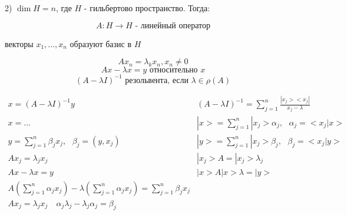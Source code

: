 \documentclass[12pt, a4paper]{report}
\begin{document}
2) \( \dim H = n \), где \( H \) - гильбертово пространство. Тогда: 

\[ A : H \to  H \text{ - линейный оператор}  \] 

векторы \( x_1, \ldots, x_n \) образуют базис в \( H  \) 

\[ A x_n = \lambda_k x_n ,x_n \neq 0 \] 
\[ Ax - \lambda x = y \text{ относительно } x  \] 
\[ (A - \lambda I )^{-1} \text{  резольвента, если } \lambda \in \rho (A)   \] 

\[ \begin{array}{l|l}
x = (A - \lambda I )^{-1 }  y & \displaystyle  (A - \lambda I )^{-1 }  = \sum_{j =1} ^n \frac{ |x_j > < x_j |}{x_j - \lambda}  \\ 
x= ... & \displaystyle  |x > = \sum_{j =1}^{n } |x_j > \alpha_j , \text{ }  \alpha_j = <x_j |x > \\
\displaystyle  y= \sum_{j =1}^n \beta_j x_j , \text{ }  \beta_j = (y , x_j ) & \displaystyle | y > = \sum_{j =1}^ n |x_j > \beta_j , \text{ }  \beta_j = <x_j | y> \\
A x_j = \lambda_j x_j & |x_j > A = |x_j > \lambda_j \\
Ax  - \lambda x = y & | x > A | x> \lambda = |y > \\
\displaystyle  A \left( \sum_{j =1}^n \alpha_j x_j  \right) - \lambda \left( \sum_{j =1}^n \alpha_j x_j \right) = \sum_{j =1}^n \beta_j x_j & \\ 
A x_j = \lambda_j x_j \quad  \alpha_j \lambda_j - \lambda_j \alpha_j = \beta_j &\\
\end{array} \] 

\ifdefined\mainfile
\else
    
\end{document}
